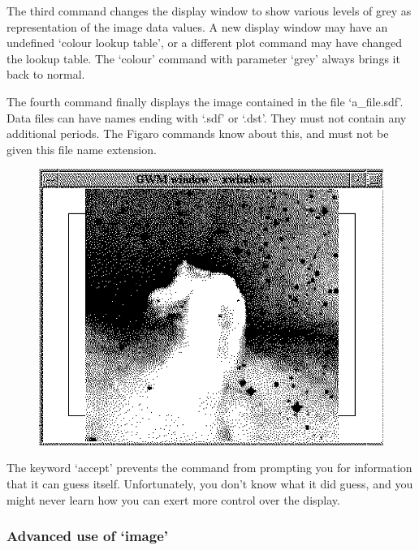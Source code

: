    The third command changes the display window to show various levels
   of grey as representation of the image data values. A new display
   window may have an undefined `colour lookup table', or a different
   plot command may have changed the lookup table. The `colour'
   command with parameter `grey' always brings it back to normal.

   The fourth command finally displays the image contained in the file
   `a\_file.sdf'. Data files can have names ending with `.sdf' or
   `.dst'. They must not contain any additional periods. The Figaro
   commands know about this, and must not be given this file name
   extension.

\begin{latexonly}
\begin{figure}[htb]
\begin{center}
\includegraphics{sun86_imag.eps}
\end{center}
\end{figure}
\end{latexonly}

   The keyword `accept' prevents the command from prompting you for
   information that it can guess itself. Unfortunately, you don't know
   what it did guess, and you might never learn how you can exert more
   control over the display.


\subsubsection{\label{lookimagadvanced}Advanced use of `image'}

